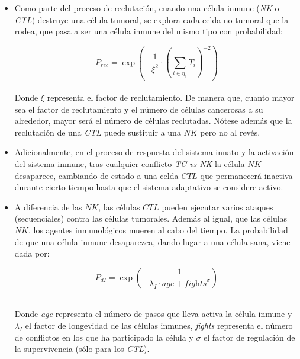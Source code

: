 \begin{itemize}
\item Como parte del proceso de reclutación, cuando una célula inmune (\textit{NK} o \textit{CTL}) destruye una célula tumoral, se explora cada celda no tumoral que la rodea, que pasa a ser una célula inmune del mismo tipo con probabilidad: 

\begin{equation}
    P_{rec} = \exp{\left(-\frac{1}{\xi^2} \cdot \left( \sum_{i \in \eta_1} T_i  \right)^{-2} \right)}
\end{equation}\\

Donde $\xi$ representa el factor de reclutamiento. De manera que, cuanto mayor sea el factor de reclutamiento y el número de células cancerosas a su alrededor, mayor será el número de células reclutadas. Nótese además que la reclutación de una \textit{CTL} puede sustituir a una $NK$ pero no al revés.\\

\item Adicionalmente, en el proceso de respuesta del sistema innato y la activación del sistema inmune, tras cualquier conflicto \textit{TC vs NK} la célula $NK$ desaparece, cambiando de estado a una celda $CTL$ que permanecerá inactiva durante cierto tiempo hasta que el sistema adaptativo se considere activo. \\

\item A diferencia de las $NK$, las células $CTL$ pueden ejecutar varios ataques (secuenciales) contra las células tumorales. Además al igual, que las células $NK$, los agentes inmunológicos mueren al cabo del tiempo. La probabilidad de que una célula inmune desaparezca, dando lugar a una célula sana, viene dada por:

\begin{equation}
    P_{dI} = \exp{\left(- \frac{1}{\lambda_I \cdot \textit{age} + \textit{fights}^{\sigma}}\right)}
\end{equation}\\


Donde \textit{age} representa el número de pasos que lleva activa la célula inmune y $\lambda_I$ el factor de longevidad de las células inmunes, \textit{fights} representa el número de conflictos en los que ha participado la célula y $\sigma$ el factor de regulación de la supervivencia (sólo para los \textit{CTL}). 

\end{itemize}






